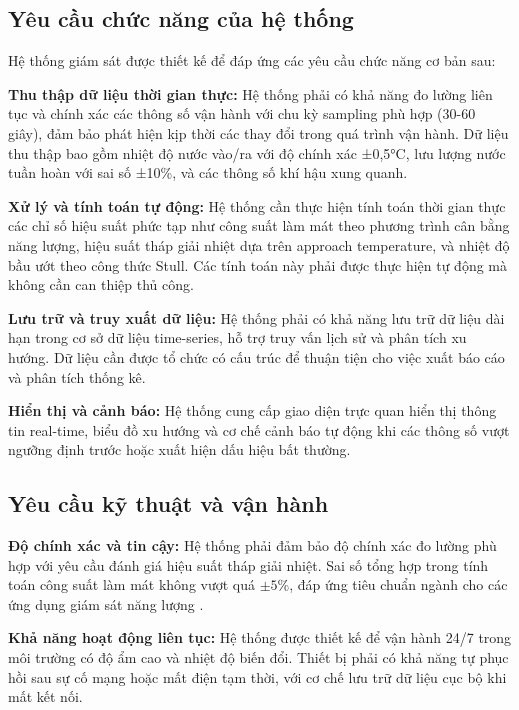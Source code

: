 \documentclass[../main.tex]{subfiles}
\begin{document}
\subsection{Yêu cầu chức năng của hệ thống}
\label{sec:functional_requirements}

Hệ thống giám sát được thiết kế để đáp ứng các yêu cầu chức năng cơ bản sau:

\textbf{Thu thập dữ liệu thời gian thực:} Hệ thống phải có khả năng đo lường liên tục và chính xác các thông số vận hành với chu kỳ sampling phù hợp (30-60 giây), đảm bảo phát hiện kịp thời các thay đổi trong quá trình vận hành. Dữ liệu thu thập bao gồm nhiệt độ nước vào/ra với độ chính xác ±0,5°C, lưu lượng nước tuần hoàn với sai số ±10\%, và các thông số khí hậu xung quanh.

\textbf{Xử lý và tính toán tự động:} Hệ thống cần thực hiện tính toán thời gian thực các chỉ số hiệu suất phức tạp như công suất làm mát theo phương trình cân bằng năng lượng, hiệu suất tháp giải nhiệt dựa trên approach temperature, và nhiệt độ bầu ướt theo công thức Stull. Các tính toán này phải được thực hiện tự động mà không cần can thiệp thủ công.

\textbf{Lưu trữ và truy xuất dữ liệu:} Hệ thống phải có khả năng lưu trữ dữ liệu dài hạn trong cơ sở dữ liệu time-series, hỗ trợ truy vấn lịch sử và phân tích xu hướng. Dữ liệu cần được tổ chức có cấu trúc để thuận tiện cho việc xuất báo cáo và phân tích thống kê.

\textbf{Hiển thị và cảnh báo:} Hệ thống cung cấp giao diện trực quan hiển thị thông tin real-time, biểu đồ xu hướng và cơ chế cảnh báo tự động khi các thông số vượt ngưỡng định trước hoặc xuất hiện dấu hiệu bất thường.

\subsection{Yêu cầu kỹ thuật và vận hành}
\label{sec:technical_requirements}

\textbf{Độ chính xác và tin cậy:} Hệ thống phải đảm bảo độ chính xác đo lường phù hợp với yêu cầu đánh giá hiệu suất tháp giải nhiệt. Sai số tổng hợp trong tính toán công suất làm mát không vượt quá $\pm 5\%$, đáp ứng tiêu chuẩn ngành cho các ứng dụng giám sát năng lượng \cite{ashrae2020cooling}.

\textbf{Khả năng hoạt động liên tục:} Hệ thống được thiết kế để vận hành 24/7 trong môi trường có độ ẩm cao và nhiệt độ biến đổi. Thiết bị phải có khả năng tự phục hồi sau sự cố mạng hoặc mất điện tạm thời, với cơ chế lưu trữ dữ liệu cục bộ khi mất kết nối.
\end{document}
